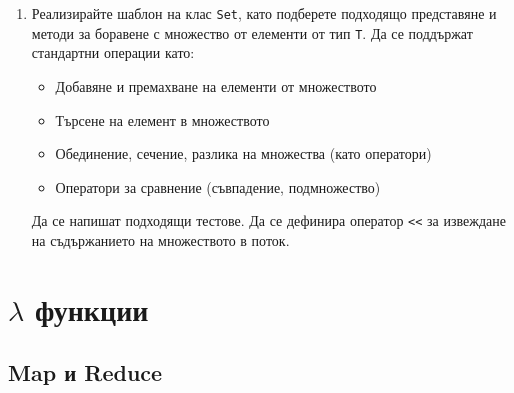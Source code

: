 \begin{enumerate}[resume]
\item Реализирайте шаблон на клас \texttt{Set}, като подберете подходящо представяне и методи за боравене с множество от елементи от тип \texttt{T}. Да се поддържат стандартни операции като:
\begin{itemize}
  \item Добавяне и премахване на елементи от множеството
  \item Търсене на елемент в множеството
  \item Обединение, сечение, разлика на множества (като оператори)
  \item Оператори за сравнение (съвпадение, подмножество)
\end{itemize}

Да се напишат подходящи тестове. Да се дефинира оператор \texttt{<<} за извеждане на съдържанието на множеството в поток.






\end{enumerate}


\pagebreak

\clearpage

\section{$\lambda$ функции}

\subsection {Map и Reduce}

